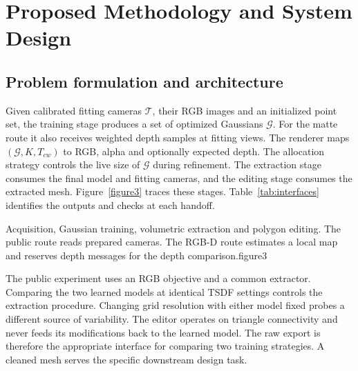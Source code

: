 \section{Proposed Methodology and System Design}
\subsection{Problem formulation and architecture}
Given calibrated fitting cameras $\mathcal T$, their RGB images and an initialized point set, the training stage produces a set of optimized Gaussians $\mathcal G$. For the matte route it also receives weighted depth samples at fitting views. The renderer maps $(\mathcal G,K,T_{cw})$ to RGB, alpha and optionally expected depth. The allocation strategy controls the live size of $\mathcal G$ during refinement. The extraction stage consumes the final model and fitting cameras, and the editing stage consumes the extracted mesh. Figure~\ref{figure3} traces these stages. Table~\ref{tab:interfaces} identifies the outputs and checks at each handoff.

  {Acquisition, Gaussian training, volumetric extraction and polygon editing. The public route reads prepared cameras. The RGB-D route estimates a local map and reserves depth messages for the depth comparison.}{figure3}

The public experiment uses an RGB objective and a common extractor. Comparing the two learned models at identical TSDF settings controls the extraction procedure. Changing grid resolution with either model fixed probes a different source of variability. The editor operates on triangle connectivity and never feeds its modifications back to the learned model. The raw export is therefore the appropriate interface for comparing two training strategies. A cleaned mesh serves the specific downstream design task.

